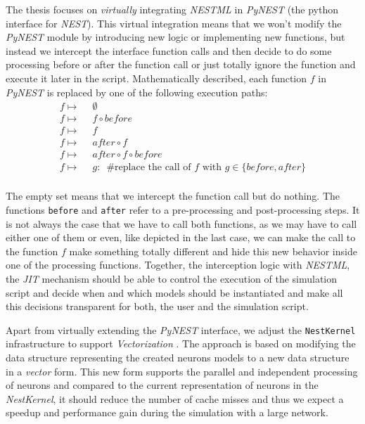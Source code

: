 The thesis focuses on \emph{virtually} integrating \emph{NESTML} in \emph{PyNEST} (the python interface for \emph{NEST}). This virtual integration means that we won't modify the \emph{PyNEST} module by introducing new logic or implementing new functions, but instead we intercept the interface function calls and then decide to do some processing before or after the function call or just totally ignore the function and execute it later in the script. Mathematically described, each function $f$ in \emph{PyNEST} is replaced by one of the following execution paths:
\begin{align*} 
f \mapsto&\enspace\emptyset\\
f \mapsto&\enspace f \circ before \\
f \mapsto&\enspace f \\
f \mapsto&\enspace after \circ f \\
f \mapsto&\enspace after \circ f \circ before\\
f \mapsto&\enspace g:\enspace \text{\#replace the call of } f \text{ with } g \in \{before, after\}  \\
\end{align*}

The empty set means that we intercept the function call but do nothing. The functions \texttt{before} and \texttt{after} refer to a pre-processing and post-processing steps. It is not always the case that we have to call both functions, as we may have to call either one of them or even, like depicted in the last case, we can make the call to the function $f$ make something totally different and hide this new behavior inside one of  the processing functions. Together, the interception logic with \emph{NESTML}, the \emph{JIT} mechanism should be able to control the execution of the simulation script and decide when and which models should be instantiated and make all this decisions transparent for both, the user and the simulation script.

Apart from virtually extending the \emph{PyNEST} interface, we adjust the \texttt{NestKernel} infrastructure to support \emph{Vectorization} \cite{nuzman2006auto}. The approach is based on modifying the data structure representing the created neurons models to a new data structure in a \emph{vector} form. This new form supports the parallel and independent processing of neurons and compared to the current representation of neurons in the \emph{NestKernel}, it should reduce the number of cache misses \cite{ghosh1997cache} and thus we expect a speedup and performance gain during the simulation with a large network.

